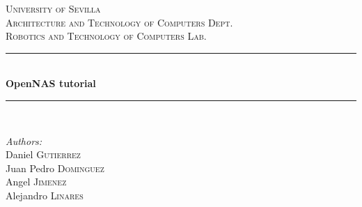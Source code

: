 \begin{titlepage}

\newcommand{\HRule}{\rule{\linewidth}{0.5mm}} %

\center %
 

\textsc{\LARGE University of Sevilla}\\[1.5cm] %
\textsc{\Large Architecture and Technology of Computers Dept.}\\[0.5cm] %
\textsc{\large Robotics and Technology of Computers Lab.}\\[0.5cm] %


\HRule \\[0.4cm]
{ \huge \bfseries OpenNAS tutorial}\\[0.4cm] %
\HRule \\[1.5cm]
 

\begin{minipage}{0.4\textwidth}

\begin{flushleft} \large
\emph{Authors:}\\
Daniel \textsc{Gutierrez} \\ %
Juan Pedro \textsc{Dominguez} \\
Angel \textsc{Jimenez} \\
Alejandro \textsc{Linares}
\end{flushleft}
\end{minipage}
~


\end{titlepage}
